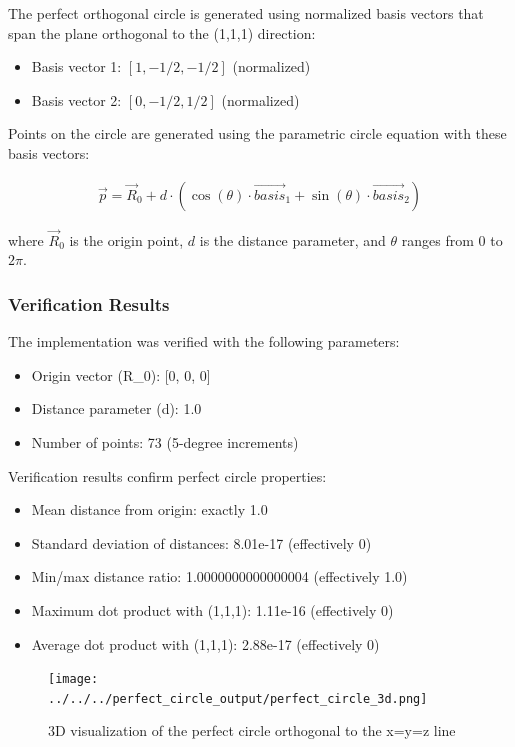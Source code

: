 The perfect orthogonal circle is generated using normalized basis vectors that span the plane orthogonal to the (1,1,1) direction:

\begin{itemize}
    \item Basis vector 1: $[1, -1/2, -1/2]$ (normalized)
    \item Basis vector 2: $[0, -1/2, 1/2]$ (normalized)
\end{itemize}

Points on the circle are generated using the parametric circle equation with these basis vectors:

\begin{align}
\vec{p} = \vec{R}_0 + d \cdot (\cos(\theta) \cdot \vec{basis}_1 + \sin(\theta) \cdot \vec{basis}_2)
\end{align}

where $\vec{R}_0$ is the origin point, $d$ is the distance parameter, and $\theta$ ranges from 0 to $2\pi$.

\subsubsection{Verification Results}

The implementation was verified with the following parameters:
\begin{itemize}
    \item Origin vector (R\_0): [0, 0, 0]
    \item Distance parameter (d): 1.0
    \item Number of points: 73 (5-degree increments)
\end{itemize}

Verification results confirm perfect circle properties:
\begin{itemize}
    \item Mean distance from origin: exactly 1.0
    \item Standard deviation of distances: 8.01e-17 (effectively 0)
    \item Min/max distance ratio: 1.0000000000000004 (effectively 1.0)
    \item Maximum dot product with (1,1,1): 1.11e-16 (effectively 0)
    \item Average dot product with (1,1,1): 2.88e-17 (effectively 0)
\end{itemize}

\begin{figure}[H]
    \centering
    \texttt{[image: ../../../perfect\_circle\_output/perfect\_circle\_3d.png]}
    \caption{3D visualization of the perfect circle orthogonal to the x=y=z line}
    \label{fig:perfect_circle_3d}
\end{figure}

